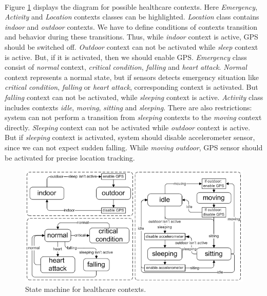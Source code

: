 \documentclass[12pt,a4paper]{article}
\begin{document}
\paragraph{}
Figure \ref{fig:hcd} displays the diagram for possible healthcare contexts. Here \textit{Emergency}, \textit{Activity} and \textit{Location} contexts classes can be highlighted. \textit{Location} class contains \textit{indoor} and \textit{outdoor} contexts. We have to define conditions of contexts transition and behavior during these transitions. Thus, while \textit{indoor} context is active, GPS should be switched off. \textit{Outdoor} context can not be activated while \textit{sleep} context is active. But, if it is activated, then we should enable GPS. \textit{Emergency} class consist of \textit{normal} context, \textit{critical condition}, \textit{falling} and \textit{heart attack}. \textit{Normal} context represents a normal state, but if sensors detects emergency situation like \textit{critical condition}, \textit{falling} or \textit{heart attack}, corresponding context is activated. But \textit{falling} context can not be activated, while \textit{sleeping} context is active. \textit{Activity} class includes contexts \textit{idle}, \textit{moving}, \textit{sitting} and \textit{sleeping}. There are also restrictions: system can not perform a transition from \textit{sleeping} contexts to the \textit{moving} context directly. \textit{Sleeping} context can not be activated while \textit{outdoor} context is active. But if \textit{sleeping} context is activated, system should disable accelerometer sensor, since we can not expect sudden falling. While \textit{moving} \textit{outdoor}, GPS sensor should be activated for precise location tracking.

\begin{figure}[H]
\centerline{
  \includegraphics{healthcare.png}
}
\caption{State machine for healthcare contexts.}
\label{fig:hcd}
\end{figure}
\end{document}
